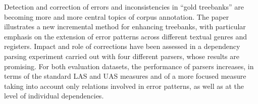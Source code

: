 Detection and correction of errors and inconsistencies in ``gold treebanks'' are becoming more and more central topics of corpus annotation. The paper illustrates a new incremental method for enhancing treebanks, with particular emphasis on the extension of error patterns across different textual genres and registers. Impact and role of corrections have been assessed in a dependency parsing experiment carried out with four different parsers, whose results are promising. For both evaluation datasets, the performance of parsers increases, in terms of the standard LAS and UAS measures and of a more focused measure taking into account only relations involved in error patterns, as well as at the level of individual dependencies.

